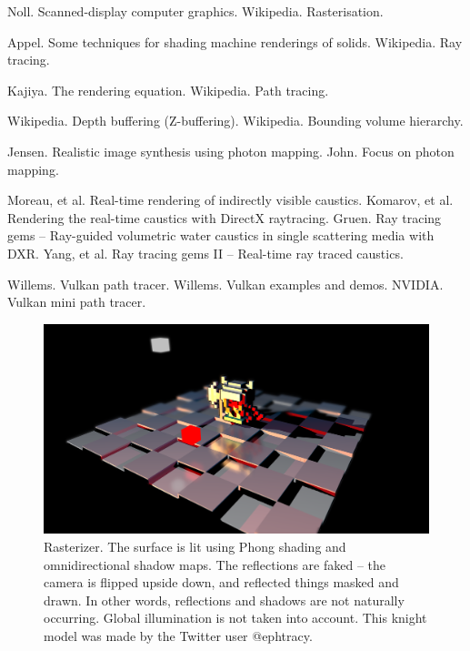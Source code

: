 \documentclass[12pt]{article}
\begin{document}
\begin{thebibliography}{9}

 Noll. Scanned-display computer graphics.
 Wikipedia. Rasterisation.

 Appel. Some techniques for shading machine renderings of solids.
 Wikipedia. Ray tracing.

 Kajiya. The rendering equation.
 Wikipedia. Path tracing.

 Wikipedia. Depth buffering (Z-buffering).
 Wikipedia. Bounding volume hierarchy.


 Jensen. Realistic image synthesis using photon mapping.
 John. Focus on photon mapping.


 Moreau, et al. Real-time rendering of indirectly visible caustics.
 Komarov, et al. Rendering the real-time caustics with DirectX raytracing.
 Gruen. Ray tracing gems -- Ray-guided volumetric water caustics in single scattering media with DXR.
 Yang, et al. Ray tracing gems II -- Real-time ray traced caustics.






 Willems. Vulkan path tracer.
 Willems. Vulkan examples and demos.
 NVIDIA. Vulkan mini path tracer.



\end{thebibliography}


\pagebreak







\begin{figure} 
\centering
  \includegraphics[width = 6 in]{fig1.png}
  \caption{ Rasterizer.
The surface is lit using Phong shading and omnidirectional shadow maps.
The reflections are faked -- the camera is flipped upside down, and reflected things masked and drawn.
In other words, reflections and shadows are not naturally occurring.
Global illumination is not taken into account.
This knight model was made by the Twitter user @ephtracy.
}

\end{figure}
\end{document}
